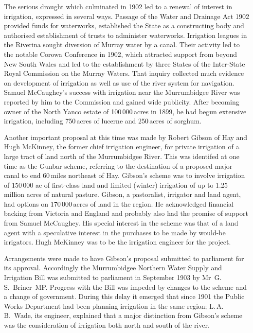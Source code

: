 The serious drought which culminated in 1902 led to a renewal of
interest in irrigation, expressed in several ways.  Passage of the
Water and Drainage Act 1902 provided funds for waterworks, established
the State as a constructing body and authorised establishment of
trusts to administer waterworks.  Irrigation leagues in the Riverina
sought diversion of Murray water by a canal.  Their activity led to
the notable Corowa Conference in 1902, which attracted support from
beyond New South Wales and led to the establishment by three States of
the Inter-State Royal Commission on the Murray Waters.  That inquiry
collected much evidence on development of irrigation as well as use of
the river system for navigation. Samuel McCaughey's success with
irrigation near the Murrumbidgee River was reported by him to the
Commission and gained wide publicity. After becoming owner of the
North Yanco  estate of 100\,000\,acres in 1899, he
had begun extensive irrigation, including 750\,acres of lucerne and
250\,acres of sorghum.


Another important proposal at this time was made by Robert Gibson
 of Hay and Hugh McKinney,  the
former chief irrigation engineer, for private irrigation of a large
tract of land north of the Murrumbidgee
River.  This was identifed at one time as
the Gunbar scheme, referring to the destination of a proposed major
canal to end 60\,miles northeast of Hay.  Gibson's scheme was to
involve irrigation of 150\,000 ac of first-class land and limited
(winter) irrigation of up to 1.25 million acres of natural pasture.
Gibson, a pastoralist, irrigator and land agent, had options on
170\,000\,acres of land in the region.  He acknowledged financial
backing from Victoria and England and probably also had the promise of
support from Samuel McCaughey.  His special interest in the scheme was
that of a land agent with a speculative interest in the purchases to
be made by would-be irrigators.  Hugh McKinney was to be the
irrigation engineer for the project. 

Arrangements were made to have Gibson's proposal submitted to
parliament for its approval.  Accordingly the Murrumbidgee Northern
Water Supply and Irrigation Bill was submitted to parliament in
September 1903 by Mr~G.\,S.~Briner~MP.  Progress
with the Bill was impeded by changes to the scheme and a change of
government. During this delay it emerged that since 1901 the Public
Works Department had been planning irrigation in the same region;
L.\,A.\,B.~Wade,
 its
engineer, explained that a major distinction from Gibson's scheme was
the consideration of irrigation both north and south of the
river.

